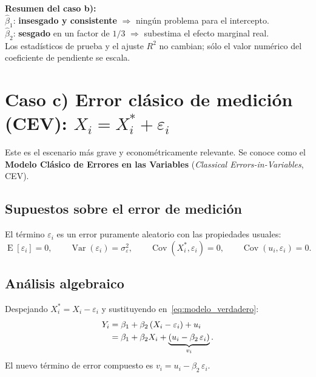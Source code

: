 \documentclass[12pt, letterpaper]{article}
\newcommand{\Cov}{\operatorname{Cov}}
\newcommand{\Var}{\operatorname{Var}}
\newcommand{\E}{\operatorname{E}}
\begin{document}
\begin{clave}
  \textbf{Resumen del caso b):}\\
  $\hat{\beta}_1$: \textbf{insesgado y consistente} $\Rightarrow$ ningún
  problema para el intercepto.\\
  $\hat{\beta}_2$: \textbf{sesgado} en un factor de $1/3$ $\Rightarrow$
  subestima el efecto marginal real.\\
  Los estadísticos de prueba y el ajuste $R^2$ no cambian; sólo el valor
  numérico del coeficiente de pendiente se escala.
\end{clave}

\section{Caso c) Error clásico de medición (CEV): $X_i = X_i^* + \varepsilon_i$}

Este es el escenario más grave y econométricamente relevante.
Se conoce como el \textbf{Modelo Clásico de Errores en las Variables}
(\textit{Classical Errors-in-Variables}, CEV).

\subsection{Supuestos sobre el error de medición}

El término $\varepsilon_i$ es un error puramente aleatorio con las
propiedades usuales:
\[
  \E[\varepsilon_i] = 0, \qquad
  \Var(\varepsilon_i) = \sigma_\varepsilon^2, \qquad
  \Cov(X_i^*, \varepsilon_i) = 0, \qquad
  \Cov(u_i, \varepsilon_i) = 0.
\]

\subsection{Análisis algebraico}

Despejando $X_i^* = X_i - \varepsilon_i$ y sustituyendo en~\eqref{eq:modelo_verdadero}:
\begin{align}
  Y_i &= \beta_1 + \beta_2\,(X_i - \varepsilon_i) + u_i \notag\\
      &= \beta_1 + \beta_2 X_i + \underbrace{(u_i - \beta_2\,\varepsilon_i)}_{v_i}.
  \label{eq:caso_c}
\end{align}
El nuevo término de error compuesto es $v_i = u_i - \beta_2\,\varepsilon_i$.
\end{document}

